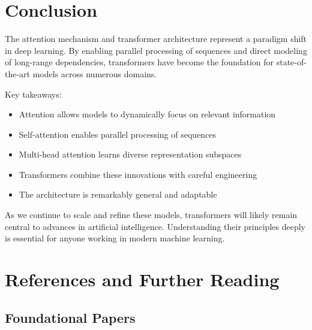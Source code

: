 
\section{Conclusion}

The attention mechanism and transformer architecture represent a paradigm shift in deep learning. By enabling parallel processing of sequences and direct modeling of long-range dependencies, transformers have become the foundation for state-of-the-art models across numerous domains.

Key takeaways:
\begin{itemize}
    \item Attention allows models to dynamically focus on relevant information
    \item Self-attention enables parallel processing of sequences
    \item Multi-head attention learns diverse representation subspaces
    \item Transformers combine these innovations with careful engineering
    \item The architecture is remarkably general and adaptable
\end{itemize}

As we continue to scale and refine these models, transformers will likely remain central to advances in artificial intelligence. Understanding their principles deeply is essential for anyone working in modern machine learning.

\section{References and Further Reading}

\subsection{Foundational Papers}

